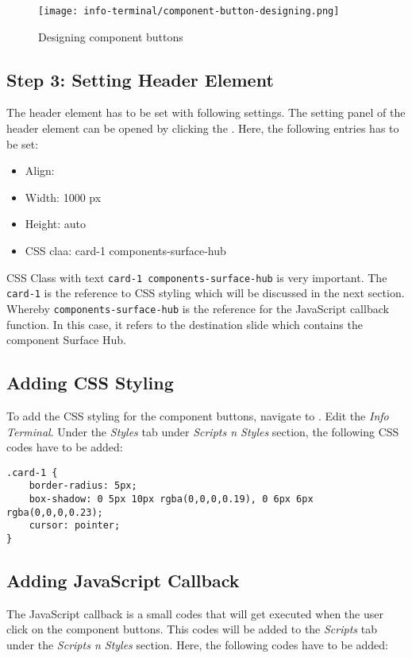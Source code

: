 \begin{figure}[ht]
\caption{Designing component buttons}
\label{fig:component-button-designing}
\centering
\texttt{[image: info-terminal/component-button-designing.png]}
\end{figure}

\subsection*{Step 3: Setting Header Element}
The header element has to be set with following settings. The setting panel of the header element can be opened by clicking the . Here, the following entries has to be set:
\begin{itemize}
\item Align:
\item Width: 1000 px
\item Height: auto
\item CSS claa: card-1 components-surface-hub
\end{itemize}

CSS Class with text \texttt{card-1 components-surface-hub} is very important. The \texttt{card-1} is the reference to CSS styling which will be discussed in the next section. Whereby \texttt{components-surface-hub} is the reference for the JavaScript callback function. In this case, it refers to the destination slide which contains the component Surface Hub.

\subsection*{Adding CSS Styling}
To add the CSS styling for the component buttons, navigate to . Edit the \emph{Info Terminal}. Under the \emph{Styles} tab under \emph{Scripts n Styles} section, the following CSS codes have to be added:

\begin{lstlisting}
.card-1 {
	border-radius: 5px;
	box-shadow: 0 5px 10px rgba(0,0,0,0.19), 0 6px 6px rgba(0,0,0,0.23);
	cursor: pointer;
}
\end{lstlisting}

\subsection*{Adding JavaScript Callback}
The JavaScript callback is a small codes that will get executed when the user click on the component buttons. This codes will be added to the \emph{Scripts} tab under the \emph{Scripts n Styles} section. Here, the following codes have to be added:

